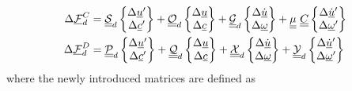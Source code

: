 \begin{align}
   \label{DampingForceLinear-1}
    \Delta \underline{\mathcal{F}}^C_d &= \underline{\underline{\mathcal{S}}}_d \begin{Bmatrix}
    \Delta \underline{u}^\prime \\
    \Delta \underline{c}^\prime
    \end{Bmatrix} + \underline{\underline{\mathcal{O}}}_d \begin{Bmatrix}
    \Delta \underline{u} \\
    \Delta \underline{c}
    \end{Bmatrix} + \underline{\underline{\mathcal{G}}}_d \begin{Bmatrix}
    \Delta \underline{\dot{u}} \\
    \Delta \underline{\omega}
    \end{Bmatrix}     + \underline{\underline{\mu}} ~\underline{\underline{C}} \begin{Bmatrix}
    \Delta \underline{\dot{u}}^\prime \\
    \Delta \underline{\omega}^\prime
    \end{Bmatrix} \\
    \label{DampingForceLinear-2}
    \Delta \underline{\mathcal{F}}^D_d &= \underline{\underline{\mathcal{P}}}_d \begin{Bmatrix}
    \Delta \underline{u}^\prime \\
    \Delta \underline{c}^\prime
    \end{Bmatrix} + \underline{\underline{\mathcal{Q}}}_d \begin{Bmatrix}
    \Delta \underline{u} \\
    \Delta \underline{c}
    \end{Bmatrix} + \underline{\underline{\mathcal{X}}}_d \begin{Bmatrix}
    \Delta \underline{\dot{u}} \\
    \Delta \underline{\omega}
    \end{Bmatrix}     + \underline{\underline{\mathcal{Y}}}_d \begin{Bmatrix}
    \Delta \underline{\dot{u}}^\prime \\
    \Delta \underline{\omega}^\prime
    \end{Bmatrix}
\end{align}
where the newly introduced matrices are defined as
